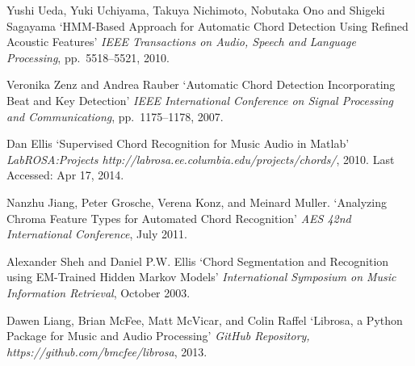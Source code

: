 \documentclass{article}
\begin{document}
\begin{thebibliography}{citations}
Yushi Ueda, Yuki Uchiyama, Takuya Nichimoto, Nobutaka Ono and Shigeki Sagayama
`HMM-Based Approach for Automatic Chord Detection Using Refined Acoustic Features'
{\it IEEE Transactions on Audio, Speech and Language Processing},
pp.~5518--5521, 2010.

Veronika Zenz and Andrea Rauber
`Automatic Chord Detection Incorporating Beat and Key Detection'
{\it IEEE International Conference on Signal Processing and Communicationg},
pp.~1175--1178, 2007.

Dan Ellis
`Supervised Chord Recognition for Music Audio in Matlab'
{\it LabROSA:\@ Projects http://labrosa.ee.columbia.edu/projects/chords/},
2010. Last Accessed: Apr 17, 2014.

Nanzhu Jiang, Peter Grosche, Verena Konz, and Meinard Muller.
`Analyzing Chroma Feature Types for Automated Chord Recognition'
{\it AES 42nd International Conference},
July 2011.

Alexander Sheh and Daniel P.W. Ellis
`Chord Segmentation and Recognition using EM-Trained Hidden Markov Models'
{\it International Symposium on Music Information Retrieval},
October 2003.

Dawen Liang, Brian McFee, Matt McVicar, and Colin Raffel
`Librosa, a Python Package for Music and Audio Processing'
{\it GitHub Repository, https://github.com/bmcfee/librosa},
2013.

\end{thebibliography}


\end{document}
